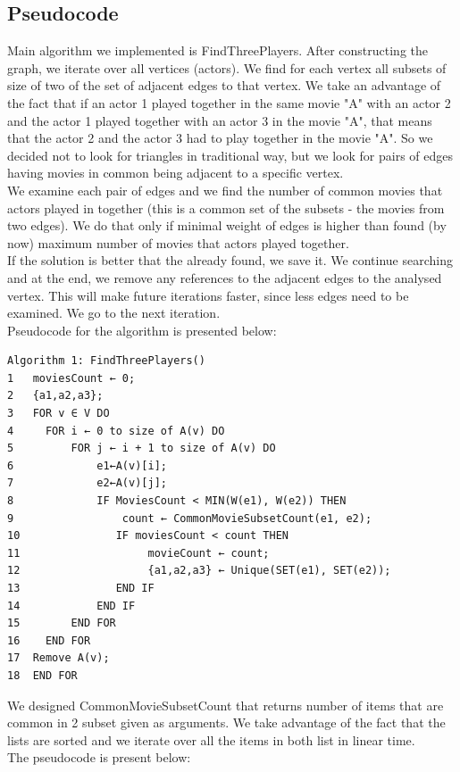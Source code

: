 \subsection{Pseudocode}
Main algorithm we implemented is FindThreePlayers. After constructing the graph, we iterate over all vertices (actors). We find for each vertex all subsets of size of two of the set of adjacent edges to that vertex. We take an advantage of the fact that if an actor 1 played together in the same movie "A" with an actor 2 and the actor 1 played together with an actor 3 in the movie "A", that means that the actor 2 and the actor 3 had to play together in the movie "A". So we decided not to look for triangles in traditional way, but we look for pairs of edges having movies in common being adjacent to a specific vertex.
\\
We examine each pair of edges and we find the number of common movies that actors played in together (this is a common set of the subsets - the movies from two edges).  We do that only if minimal weight of edges is higher than found (by now) maximum number of movies that actors played together. 
\\
If the solution is better that the already found, we save it. We continue searching and at the end, we remove any references to the adjacent edges to the analysed vertex. This will make future iterations faster, since less edges need to be examined. We go to the next iteration. 
\\
Pseudocode for the algorithm is presented below:

\begin{verbatim}
Algorithm 1: FindThreePlayers()
1	moviesCount ← 0;
2	{a1,a2,a3};
3	FOR v ∈ V DO
4	  FOR i ← 0 to size of A(v) DO
5	      FOR j ← i + 1 to size of A(v) DO
6	          e1←A(v)[i];
7	          e2←A(v)[j];
8	          IF MoviesCount < MIN(W(e1), W(e2)) THEN
9	              count ← CommonMovieSubsetCount(e1, e2);
10	             IF moviesCount < count THEN
11	                  movieCount ← count;
12	                  {a1,a2,a3} ← Unique(SET(e1), SET(e2));
13	             END IF
14	          END IF
15	      END FOR
16	  END FOR
17	Remove A(v);
18	END FOR	  	                    	  
\end{verbatim}


We designed CommonMovieSubsetCount that returns number of items that are common in 2 subset given as arguments. We take advantage of the fact that the lists are sorted and we iterate over all the items in both list in linear time. 
\\
The pseudocode is present below:

